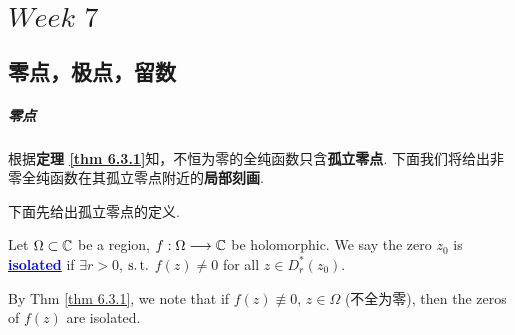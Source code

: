 \ifx\allfiles\undefined


	\else
	\fi

\chapter{$Week \,\, 7$}
\section{零点，极点，留数}
\paragraph{零点}
根据\textbf{定理 \ref{thm 6.3.1}}知，不恒为零的全纯函数只含\textbf{孤立零点}. 下面我们将给出非零全纯函数在其孤立零点附近的\textbf{局部刻画}.

\vspace{2em}
下面先给出孤立零点的定义.
\begin{defn}\label{def 7.1.1}
	Let $\Omega \subset \mathbb{C}$ be a region, $f : \Omega \longrightarrow \mathbb{C}$ be holomorphic. We say the zero $z_0$ is \underline{\textcolor{blue}{\textbf{isolated}}} if $\exists r > 0$, $\operatorname{s.t.}$ $f(z) \neq 0$ for all $z \in D_{r}^{*}(z_0)$. 
	
	\begin{rmk}
		By Thm \ref{thm 6.3.1}, we note that if $f(z) \not\equiv 0$, $z \in \Omega$ (不全为零), then the zeros of $f(z)$ are isolated.
	\end{rmk}
\end{defn}

